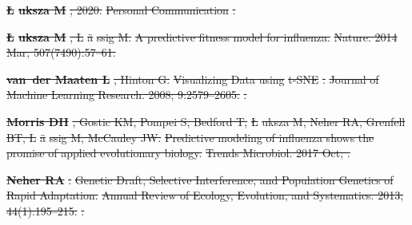 \documentclass[9pt,lineno]{elife} %
\providecommand{\DIFdel}[1]{{\protect\color{red}\sout{#1}}}                      %
\providecommand{\DIFdeltex}[1]{{\protect\color{red}\sout{#1}}}                      %
\providecommand{\DIFdel}[1]{\texorpdfstring{\DIFdeltex{#1}}{}} %
\begin{document}
\textbf{%
\DIFdel{\L}%
\DIFdel{uksza M}}%
\DIFdel{; 2020.
}%
\DIFdel{Personal Communication}%
\DIFdel{.
}%

\textbf{%
\DIFdel{\L}%
\DIFdel{uksza M}}%
\DIFdel{, L}%
\DIFdel{\"a}%
\DIFdel{ssig M.
}%
\DIFdel{A predictive fitness model for influenza.}%
\DIFdel{Nature.  2014 Mar; 507(7490):57--61.
}%

\textbf{%
\DIFdel{van~der Maaten L}}%
\DIFdel{, Hinton G.
}%
\DIFdel{Visualizing Data using }%
\DIFdel{t-SNE}%
\DIFdel{.
}%
\DIFdel{Journal of Machine Learning Research.  2008; 9:2579--2605.
}%
\DIFdel{.
}%

\textbf{%
\DIFdel{Morris DH}}%
\DIFdel{, Gostic KM, Pompei S, Bedford T,
  }%
\DIFdel{\L}%
\DIFdel{uksza M, Neher RA, Grenfell BT, L}%
\DIFdel{\"a}%
\DIFdel{ssig M, McCauley JW.
}%
\DIFdel{Predictive modeling of influenza shows the promise of applied
  evolutionary biology.}%
\DIFdel{Trends Microbiol.  2017 Oct; .
}%

\textbf{%
\DIFdel{Neher RA}}%
\DIFdel{.
}%
\DIFdel{Genetic Draft, Selective Interference, and Population Genetics of
  Rapid Adaptation.
}%
\DIFdel{Annual Review of Ecology, Evolution, and Systematics.  2013;
  44(1):195--215.
}%
\DIFdel{.
}%
\end{document}
